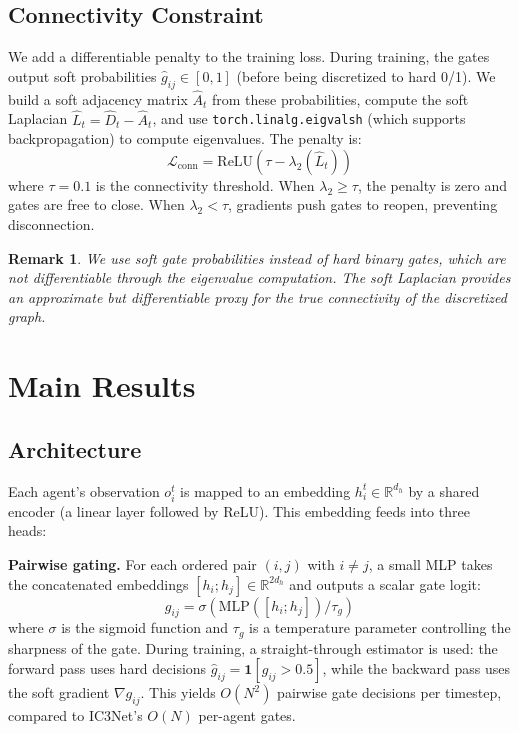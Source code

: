 \documentclass[letterpaper, 10 pt, journal, twoside]{IEEEtran}
\newtheorem{remark}{Remark}
\begin{document}
\subsection{Connectivity Constraint}

We add a differentiable penalty to the training loss. During training, the gates output soft probabilities $\hat{g}_{ij} \in [0,1]$ (before being discretized to hard 0/1). We build a soft adjacency matrix $\hat{A}_t$ from these probabilities, compute the soft Laplacian $\hat{L}_t = \hat{D}_t - \hat{A}_t$, and use \texttt{torch.linalg.eigvalsh} (which supports backpropagation) to compute eigenvalues. The penalty is:
\begin{equation}
\mathcal{L}_{\text{conn}} = \text{ReLU}(\tau - \lambda_2(\hat{L}_t))
\label{eq:conn}
\end{equation}
where $\tau = 0.1$ is the connectivity threshold. When $\lambda_2 \geq \tau$, the penalty is zero and gates are free to close. When $\lambda_2 < \tau$, gradients push gates to reopen, preventing disconnection.

\begin{remark}
We use soft gate probabilities instead of hard binary gates, which are not differentiable through the eigenvalue computation. The soft Laplacian provides an approximate but differentiable proxy for the true connectivity of the discretized graph.
\end{remark}

\section{Main Results}

\subsection{Architecture}

Each agent's observation $o_i^t$ is mapped to an embedding $h_i^t \in \mathbb{R}^{d_h}$ by a shared encoder (a linear layer followed by ReLU). This embedding feeds into three heads:

\textbf{Pairwise gating.} For each ordered pair $(i, j)$ with $i \neq j$, a small MLP takes the concatenated embeddings $[h_i; h_j] \in \mathbb{R}^{2d_h}$ and outputs a scalar gate logit:
\begin{equation}
g_{ij} = \sigma\left(\text{MLP}([h_i; h_j]) / \tau_g\right)
\end{equation}
where $\sigma$ is the sigmoid function and $\tau_g$ is a temperature parameter controlling the sharpness of the gate. During training, a straight-through estimator is used: the forward pass uses hard decisions $\hat{g}_{ij} = \mathbf{1}[g_{ij} > 0.5]$, while the backward pass uses the soft gradient $\nabla g_{ij}$. This yields $O(N^2)$ pairwise gate decisions per timestep, compared to IC3Net's $O(N)$ per-agent gates.
\end{document}
